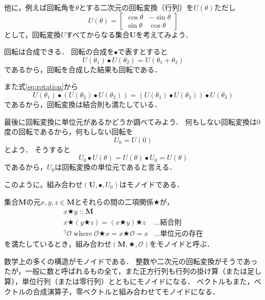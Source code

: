 \documentclass[twocolumn]{jsbook}
\newenvironment{point}{\begin{screen}}{\end{screen}}
\newcommand{\istypeof}{\mathop{::}}
\newcommand{\mathbinaryop}{\bigstar}
\newcommand{\mathidentity}{\mathcal{O}}
\newcommand{\mathsetname}[1]{\boldsymbol{#1}}
\newcommand{\mathtriple}[3]{(#1,#2,#3)}
\newcommand{\mathcompose}{\bullet}
\newcommand{\mathwhere}{\mathop{\text{where}}}
\begin{document}
他に，例えば回転角を$\theta$とする二次元の回転変換（行列）を$U(\theta)$ただし$$U(\theta)=\begin{bmatrix}\cos\theta&-\sin\theta\\\sin\theta&\cos\theta\end{bmatrix}$$として，回転変換$U$すべてからなる集合$\mathsetname{U}$を考えてみよう．

回転は合成できる．
回転の合成を$\bullet$で表すとすると
\begin{equation}
\label{eq:rotation}
U(\theta_1)\bullet U(\theta_2)=U(\theta_1+\theta_2)
\end{equation}
であるから，回転を合成した結果も回転である．

また式\eqref{eq:rotation}から$$U(\theta_1)\bullet\left(U(\theta_2)\bullet U(\theta_3)\right)=\left(U(\theta_1)\bullet U(\theta_2)\right)\bullet U(\theta_3)$$
であるから，回転変換は結合則も満たしている．

最後に回転変換に単位元があるかどうか調べてみよう．
何もしない回転変換は$0$度の回転であるから，何もしない回転を$$U_0=U(0)$$とよう．
そうすると$$U_0\bullet U(\theta)=U(\theta)\bullet U_0=U(\theta)$$であるから，$U_0$は回転変換の単位元であると言える．

このように，組み合わせ$\mathtriple{\mathsetname{U}}{\mathcompose}{U_0}$はモノイドである．

\begin{point}
集合$\mathsetname{M}$の元$x,y,z\in\mathsetname{M}$とそれらの間の二項関係$\mathbinaryop$が，
\begin{align*}
x\mathbinaryop y\istypeof\mathsetname{M}\\
x\mathbinaryop(y\mathbinaryop z)=(x\mathbinaryop y)\mathbinaryop z&\dots\text{結合則}\\
{}^\exists\mathidentity\mathwhere\mathidentity\mathbinaryop x=x\mathbinaryop\mathidentity=x&\dots\text{単位元の存在}
\end{align*}
を満たしているとき，組み合わせ$\mathtriple{\mathsetname{M}}{\mathbinaryop}{\mathidentity}$をモノイドと呼ぶ．
\end{point}

数学上の多くの構造がモノイドである．
整数や二次元の回転変換がそうであったが，一般に数と呼ばれるもの全て，また正方行列も行列の掛け算（または足し算），単位行列（または零行列）とともにモノイドになる．
ベクトルもまた，ベクトルの合成演算子，零ベクトルと組み合わせてモノイドになる．
\end{document}
